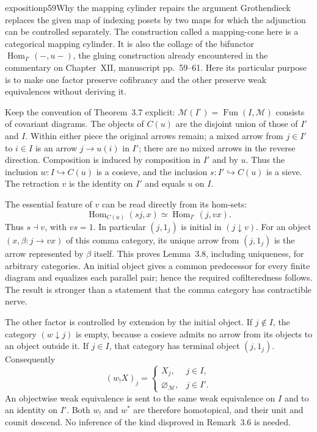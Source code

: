 \begin{dcomment}{exposition}{p59}{Why the mapping cylinder repairs the argument}
Grothendieck replaces the given map of indexing posets by two maps for which the adjunction can be controlled separately. The construction called a mapping-cone here is a categorical mapping cylinder. It is also the collage of the bifunctor $\operatorname{Hom}_{I'}(-,u-)$, the gluing construction already encountered in the commentary on Chapter~XII, manuscript pp.~59--61. Here its particular purpose is to make one factor preserve cofibrancy and the other preserve weak equivalences without deriving it.

Keep the convention of Theorem~3.7 explicit: $\mathcal M(I^\circ)=\operatorname{Fun}(I,\mathcal M)$ consists of covariant diagrams. The objects of $C(u)$ are the disjoint union of those of $I'$ and $I$. Within either piece the original arrows remain; a mixed arrow from $j\in I'$ to $i\in I$ is an arrow $j\to u(i)$ in $I'$; there are no mixed arrows in the reverse direction. Composition is induced by composition in $I'$ and by $u$. Thus the inclusion $w:I\hookrightarrow C(u)$ is a cosieve, and the inclusion $s:I'\hookrightarrow C(u)$ is a sieve. The retraction $v$ is the identity on $I'$ and equals $u$ on $I$.

The essential feature of $v$ can be read directly from its hom-sets:
\[
 \operatorname{Hom}_{C(u)}(s j,x)
 \simeq\operatorname{Hom}_{I'}(j,vx).
\]
Thus $s\dashv v$, with $vs=1$. In particular $(j,1_j)$ is initial in $(j\downarrow v)$. For an object $(x,\beta:j\to vx)$ of this comma category, its unique arrow from $(j,1_j)$ is the arrow represented by $\beta$ itself. This proves Lemma~3.8, including uniqueness, for arbitrary categories. An initial object gives a common predecessor for every finite diagram and equalizes each parallel pair; hence the required cofilteredness follows. The result is stronger than a statement that the comma category has contractible nerve.

The other factor is controlled by extension by the initial object. If $j\notin I$, the category $(w\downarrow j)$ is empty, because a cosieve admits no arrow from its objects to an object outside it. If $j\in I$, that category has terminal object $(j,1_j)$. Consequently
\[
 (w_!X)_j=\begin{cases}
 X_j,&j\in I,\\
 \varnothing_{\mathcal M},&j\in I'.
 \end{cases}
\]
An objectwise weak equivalence is sent to the same weak equivalence on $I$ and to an identity on $I'$. Both $w_!$ and $w^*$ are therefore homotopical, and their unit and counit descend. No inference of the kind disproved in Remark~3.6 is needed.


\end{dcomment}
